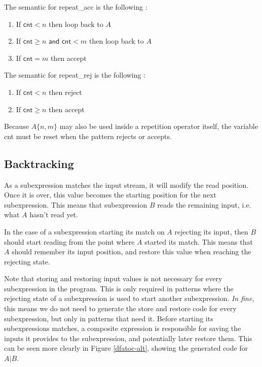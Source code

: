 \documentclass[11pt,a4paper]{report}
\newcommand{\regexp}[1]{$#1$}
\newcommand{\haskell}[1]{\textsf{#1}}
\begin{document}
The semantic for \haskell{repeat\_acc} is the following :
\begin{enumerate}
\item If $\haskell{cnt} < n$ then loop back to $A$
\item If $\haskell{cnt} \geq n \haskell{ and cnt} < m$ then loop back to $A$
\item If $\haskell{cnt} = m$ then accept 
\end{enumerate}

The semantic for \haskell{repeat\_rej} is the following :
\begin{enumerate}
\item If $\haskell{cnt} < n$ then reject
\item If $\haskell{cnt} \geq n$ then accept
\end{enumerate}

Because $A\{n,m\}$ may also be used inside a repetition operator itself, the variable \haskell{cnt} must be reset when the pattern rejects or accepts.

\subsection{Backtracking}

\label{backtracking}

As a subexpression matches the input stream, it will modify the read position. Once it is over, this value becomes the starting position for the next subexpression. This means that subexpression $B$ reads the remaining input, i.e. what $A$ hasn't read yet.

In the case of a subexpression starting its match on $A$ rejecting its input, then $B$ should start reading from the point where $A$ started its match. This means that $A$ should remember its input position, and restore this value when reaching the rejecting state.

Note that storing and restoring input values is not necessary for every subexpression in the program. This is only required in patterns where the rejecting state of a subexpression is used to start another subexpression. \textit{In fine}, this means we do not need to generate the store and restore code for every subexpression, but only in patterns that need it. Before starting its subexpressions matches, a composite expression is responsible for saving the inputs it provides to the subexpression, and potentially later restore them. This can be seen more clearly in Figure \ref{dfatoc-alt}, showing the generated code for \regexp{A|B}.
\end{document}
